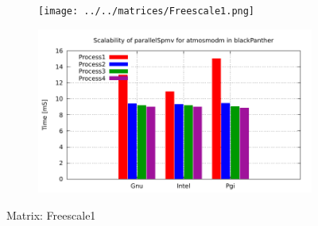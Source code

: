 \begin{figure} [ht!]
    \centering
    \captionsetup{justification=centering, singlelinecheck=false}
    \begin{subfigure}{.65\textwidth}
      \centering
      \hspace*{-3.5cm} 
      \texttt{[image: ../../matrices/Freescale1.png]}
      \label{fig:Freescale1_matrix}
    \end{subfigure}%
    \begin{subfigure}{.65\textwidth}
      \centering
      \hspace*{-6.0cm} 
      \includegraphics[page=3, width=0.95\linewidth]{../plots/blackPanther.pdf}
      \label{fig:Freescale1_performance}
    \end{subfigure}
\caption{Matrix: Freescale1}
\label{fig:Freescale1}
\end{figure}

